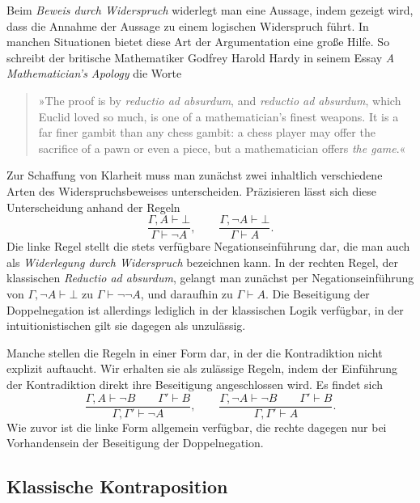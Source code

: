 Beim \emph{Beweis durch Widerspruch} widerlegt man eine Aussage, indem
gezeigt wird, dass die Annahme der Aussage zu einem logischen
Widerspruch führt. In manchen Situationen bietet
diese Art der Argumentation eine große Hilfe. So schreibt der britische
Mathematiker Godfrey Harold Hardy in seinem Essay
\emph{A Mathematician's Apology} die Worte
\begin{quote}
»The proof is by \emph{reductio ad absurdum}, and \emph{reductio ad
absurdum}, which Euclid loved so much, is one of a mathematician's
finest weapons. It is a far finer gambit than any chess gambit: a chess
player may offer the sacrifice of a pawn or even a piece, but a
mathematician offers \emph{the game}.«
\end{quote}
Zur Schaffung von Klarheit muss man zunächst zwei inhaltlich
verschiedene Arten des Widerspruchsbeweises unterscheiden.
Präzisieren lässt sich diese Unterscheidung anhand
der Regeln
\[\dfrac{\Gamma,A\vdash\bot}{\Gamma\vdash\lnot A},\qquad
\dfrac{\Gamma,\lnot A\vdash\bot}{\Gamma\vdash A}.\]
Die linke Regel stellt die stets verfügbare Negationseinführung dar,
die man auch als \emph{Widerlegung durch Widerspruch} bezeichnen kann.
In der rechten Regel, der klassischen \emph{Reductio ad absurdum},
gelangt man zunächst per Negationseinführung von
$\Gamma,\lnot A\vdash\bot$ zu $\Gamma\vdash\lnot\lnot A$, und daraufhin
zu $\Gamma\vdash A$. Die Beseitigung der Doppelnegation%
 ist allerdings lediglich in der klassischen
Logik verfügbar, in der intuitionistischen gilt sie dagegen als
unzulässig.

Manche stellen die Regeln in einer Form dar, in der die Kontradiktion
nicht explizit auftaucht. Wir erhalten sie als zulässige Regeln, indem
der Einführung der Kontradiktion direkt ihre Beseitigung
angeschlossen wird. Es findet sich
\[\dfrac{\Gamma,A\vdash\lnot B\qquad\Gamma'\vdash B}
{\Gamma,\Gamma'\vdash\lnot A},\qquad
\dfrac{\Gamma,\lnot A\vdash\lnot B\qquad\Gamma'\vdash B}
{\Gamma,\Gamma'\vdash A}.\]
Wie zuvor ist die linke Form allgemein verfügbar, die rechte dagegen
nur bei Vorhandensein der Beseitigung der Doppelnegation.

\subsection{Klassische Kontraposition}

